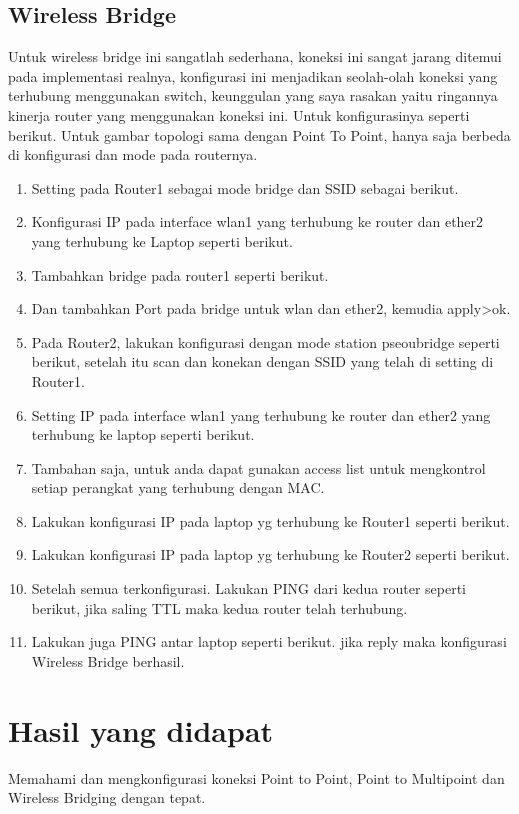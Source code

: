 \subsection{Wireless Bridge}
Untuk wireless bridge ini sangatlah sederhana, koneksi ini sangat jarang ditemui pada
implementasi realnya, konfigurasi ini menjadikan seolah-olah koneksi yang terhubung
menggunakan switch, keunggulan yang saya rasakan yaitu ringannya kinerja router yang
menggunakan koneksi ini. Untuk konfigurasinya seperti berikut.
Untuk gambar topologi sama dengan Point To Point, hanya saja berbeda di konfigurasi dan
mode pada routernya.
\begin{center}
	\begin{enumerate}
		\item Setting pada Router1 sebagai mode bridge dan SSID sebagai berikut.
		\item Konfigurasi IP pada interface wlan1 yang terhubung ke router dan ether2 yang terhubung ke Laptop seperti berikut.
		\item Tambahkan bridge pada router1 seperti berikut.
		\item Dan tambahkan Port pada bridge untuk wlan dan ether2, kemudia apply>ok.
		\item Pada Router2, lakukan konfigurasi dengan mode station pseoubridge seperti berikut, setelah itu scan dan konekan dengan SSID yang telah di setting di Router1.
		\item Setting IP pada interface wlan1 yang terhubung ke router dan ether2 yang terhubung ke laptop seperti berikut.
		\item Tambahan saja, untuk anda dapat gunakan access list untuk mengkontrol setiap perangkat yang terhubung dengan MAC.
		\item Lakukan konfigurasi IP pada laptop yg terhubung ke Router1 seperti berikut.
		\item Lakukan konfigurasi IP pada laptop yg terhubung ke Router2 seperti berikut.
		\item Setelah semua terkonfigurasi. Lakukan PING dari kedua router seperti berikut, jika saling TTL maka kedua router telah terhubung.
		\item Lakukan juga PING antar laptop seperti berikut. jika reply maka konfigurasi Wireless Bridge berhasil.
	\end{enumerate}
\end{center}

\section{Hasil yang didapat}
Memahami dan mengkonfigurasi koneksi Point to Point, Point to Multipoint dan Wireless
Bridging dengan tepat.

